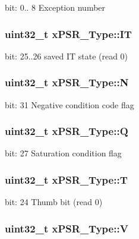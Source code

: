 bit\-: 0.. 8 Exception number \hypertarget{unionxPSR__Type_a3200966922a194d84425e2807a7f1328}{
\subsubsection[{I\-T}]{\setlength{\rightskip}{0pt plus 5cm}uint32\-\_\-t x\-P\-S\-R\-\_\-\-Type\-::\-I\-T}}\label{unionxPSR__Type_a3200966922a194d84425e2807a7f1328}
bit\-: 25..26 saved I\-T state (read 0) \hypertarget{unionxPSR__Type_a2db9a52f6d42809627d1a7a607c5dbc5}{
\subsubsection[{N}]{\setlength{\rightskip}{0pt plus 5cm}uint32\-\_\-t x\-P\-S\-R\-\_\-\-Type\-::\-N}}\label{unionxPSR__Type_a2db9a52f6d42809627d1a7a607c5dbc5}
bit\-: 31 Negative condition code flag \hypertarget{unionxPSR__Type_add7cbd2b0abd8954d62cd7831796ac7c}{
\subsubsection[{Q}]{\setlength{\rightskip}{0pt plus 5cm}uint32\-\_\-t x\-P\-S\-R\-\_\-\-Type\-::\-Q}}\label{unionxPSR__Type_add7cbd2b0abd8954d62cd7831796ac7c}
bit\-: 27 Saturation condition flag \hypertarget{unionxPSR__Type_a7eed9fe24ae8d354cd76ae1c1110a658}{
\subsubsection[{T}]{\setlength{\rightskip}{0pt plus 5cm}uint32\-\_\-t x\-P\-S\-R\-\_\-\-Type\-::\-T}}\label{unionxPSR__Type_a7eed9fe24ae8d354cd76ae1c1110a658}
bit\-: 24 Thumb bit (read 0) \hypertarget{unionxPSR__Type_af14df16ea0690070c45b95f2116b7a0a}{
\subsubsection[{V}]{\setlength{\rightskip}{0pt plus 5cm}uint32\-\_\-t x\-P\-S\-R\-\_\-\-Type\-::\-V}}\label{unionxPSR__Type_af14df16ea0690070c45b95f2116b7a0a}
